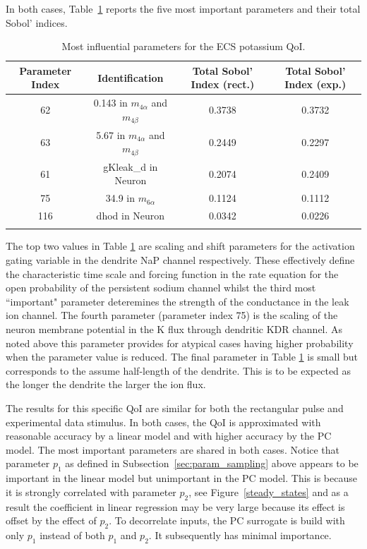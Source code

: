 In both cases, Table~\ref{tab:K_ECS_Mean} reports the five most important parameters and their total Sobol' indices. 


\begin{table}[h]
\centering
{}
\begin{tabular}{cccc}
\toprule
Parameter Index & Identification & Total Sobol' Index (rect.) & Total Sobol' Index (exp.)\\
\midrule
62 & 0.143 in $m_{4\alpha}$ and $m_{4 \beta}$ &  0.3738 & 0.3732\\
63 & 5.67 in $m_{4\alpha}$ and $m_{4 \beta}$  &  0.2449 & 0.2297\\
61 & gKleak\_d in Neuron &0.2074 & 0.2409\\
75 & 34.9 in $m_{6 \alpha}$ & 0.1124 & 0.1112\\
116 & dhod in Neuron & 0.0342 & 0.0226\\
 \arrayrulecolor{black}\bottomrule
\end{tabular}
\caption{Most influential parameters for the ECS potassium QoI.}
\label{tab:K_ECS_Mean}
\end{table}

The top two values in Table \ref{tab:K_ECS_Mean} are scaling and shift parameters for the activation gating variable in the dendrite NaP channel respectively. These effectively define the characteristic time scale and forcing function in the rate equation for the open  probability of the persistent sodium channel whilst the third most ``important" parameter deteremines the strength of the  conductance in the \pot leak ion channel. The fourth parameter (parameter index 75) is the scaling of the neuron membrane potential in the K flux through dendritic KDR channel. As noted above this parameter provides for atypical cases having higher probability when the parameter value is reduced. The final parameter in Table \ref{tab:K_ECS_Mean} is small but corresponds to the assume half-length of the dendrite. This is to be expected as the longer the dendrite the larger the ion flux. 

The results for this specific QoI are similar for both the rectangular pulse and experimental data stimulus. In both cases, the QoI is approximated with reasonable accuracy by a linear model and with higher accuracy by the PC model. The most important parameters are shared in both cases. Notice that parameter $p_1$ as defined in Subsection~\ref{sec:param_sampling} above appears to be important in the linear model but unimportant in the PC model. This is because it is strongly correlated with parameter $p_2$, see Figure~\ref{steady_states}  and as a result the coefficient in linear regression may be very large because its effect is offset by the effect of $p_2$. To decorrelate inputs, the PC surrogate is build with only $p_1$ instead of both $p_1$ and $p_2$. It subsequently has minimal importance.

